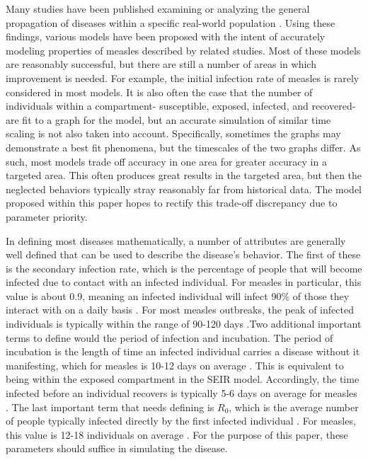 \documentclass[conference]{IEEEtran}
\newcommand{\ro}{$R_0$}
\begin{document}
Many studies have been published examining or analyzing the general propagation of diseases within a specific real-world population \cite{pinkbookMeasles,measlesIncidence,Jasem2012Elsevier,Mcbrein2003,Sugarman2010}. Using these findings, various models have been proposed with the intent of accurately modeling properties of measles described by related studies. Most of these models are reasonably successful, but there are still a number of areas in which improvement is needed. For example, the initial infection rate of measles is rarely considered in most models. It is also often the case that the number of individuals within a compartment- susceptible, exposed, infected, and recovered-are fit to a graph for the model, but an accurate simulation of similar time scaling is not also taken into account. Specifically, sometimes the graphs may demonstrate a best fit phenomena, but the timescales of the two graphs differ. As such, most models trade off accuracy in one area for greater accuracy in a targeted area. This often produces great results in the targeted area, but then the neglected behaviors typically stray reasonably far from historical data. The model proposed within this paper hopes to rectify this trade-off discrepancy due to parameter priority.

In defining most diseases mathematically, a number of attributes are generally well defined that can be used to describe the disease's behavior. The first of these is the secondary infection rate, which is the percentage of people that will become infected due to contact with an infected individual. For measles in particular, this value is about 0.9, meaning an infected individual will infect 90\% of those they interact with on a daily basis \cite{pinkbookMeasles}. For most measles outbreaks, the peak of infected individuals is typically within the range of 90-120 days \cite{pinkbookMeasles}.Two additional important terms to define would the period of infection and incubation. The period of incubation is the length of time an infected individual carries a disease without it manifesting, which for measles is 10-12 days on average \cite{pinkbookMeasles}. This is equivalent to being within the exposed compartment in the SEIR model. Accordingly, the time infected before an individual recovers is typically 5-6 days on average for measles \cite{pinkbookMeasles}. The last important term that needs defining is \ro, which is the average number of people typically infected directly by the first infected individual \cite{JamesR0}. For measles, this value is 12-18 individuals on average \cite{pinkbookMeasles}. For the purpose of this paper, these parameters should suffice in simulating the disease. 
\end{document}

